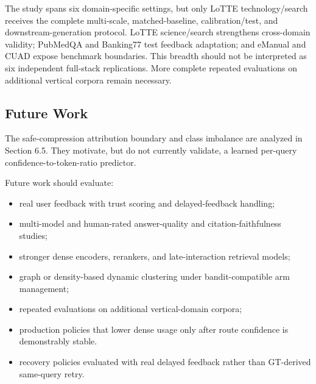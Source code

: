 The study spans six domain-specific settings, but only LoTTE technology/search receives the complete multi-scale, matched-baseline, calibration/test, and downstream-generation protocol. LoTTE science/search strengthens cross-domain validity; PubMedQA and Banking77 test feedback adaptation; and eManual and CUAD expose benchmark boundaries. This breadth should not be interpreted as six independent full-stack replications. More complete repeated evaluations on additional vertical corpora remain necessary.

\subsection{Future Work}
\label{sec:08-limitations:future-work}

The safe-compression attribution boundary and class imbalance are analyzed in Section 6.5. They motivate, but do not currently validate, a learned per-query confidence-to-token-ratio predictor.

Future work should evaluate:

\begin{itemize}
\item real user feedback with trust scoring and delayed-feedback handling;
\item multi-model and human-rated answer-quality and citation-faithfulness studies;
\item stronger dense encoders, rerankers, and late-interaction retrieval models;
\item graph or density-based dynamic clustering under bandit-compatible arm management;
\item repeated evaluations on additional vertical-domain corpora;
\item production policies that lower dense usage only after route confidence is demonstrably stable.
\item recovery policies evaluated with real delayed feedback rather than GT-derived same-query retry.
\end{itemize}
